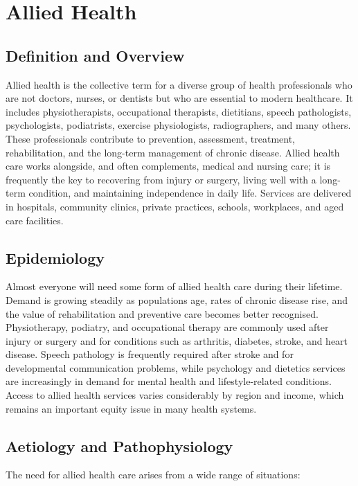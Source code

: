 \chapter{Allied Health}

\section*{Definition and Overview}
Allied health is the collective term for a diverse group of health professionals who are not doctors, nurses, or dentists but who are essential to modern healthcare. It includes physiotherapists, occupational therapists, dietitians, speech pathologists, psychologists, podiatrists, exercise physiologists, radiographers, and many others. These professionals contribute to prevention, assessment, treatment, rehabilitation, and the long-term management of chronic disease. Allied health care works alongside, and often complements, medical and nursing care; it is frequently the key to recovering from injury or surgery, living well with a long-term condition, and maintaining independence in daily life. Services are delivered in hospitals, community clinics, private practices, schools, workplaces, and aged care facilities.

\section*{Epidemiology}
Almost everyone will need some form of allied health care during their lifetime. Demand is growing steadily as populations age, rates of chronic disease rise, and the value of rehabilitation and preventive care becomes better recognised. Physiotherapy, podiatry, and occupational therapy are commonly used after injury or surgery and for conditions such as arthritis, diabetes, stroke, and heart disease. Speech pathology is frequently required after stroke and for developmental communication problems, while psychology and dietetics services are increasingly in demand for mental health and lifestyle-related conditions. Access to allied health services varies considerably by region and income, which remains an important equity issue in many health systems.

\section*{Aetiology and Pathophysiology}
The need for allied health care arises from a wide range of situations:

